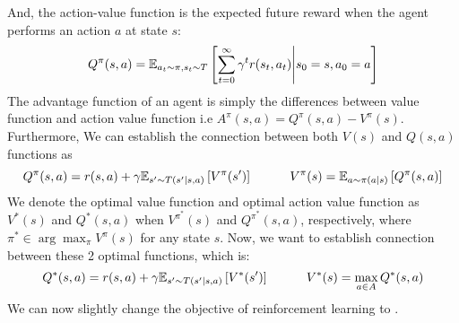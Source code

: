 And, the action-value function is the expected future reward when the agent performs an action $a$ at state $s$: 
\begin{equation}
    Q^\pi(s, a) = \mathbb{E}_{a_t \sim \pi, s_t \sim T}\left[ \sum^\infty_{t=0} \gamma^t r(s_t, a_t) \Bigg| s_0 = s, a_0 = a \right]
\end{equation}
The advantage function of an agent is simply the differences between value function and action value function i.e $A^{\pi}(s, a) = Q^\pi(s, a) - V^\pi(s)$. Furthermore, We can establish the connection between both $V(s)$ and $Q(s, a)$ functions as
\begin{equation}
    \label{eqn:chap2-Q-and-V}
    Q^\pi(s, a) = r(s, a) + \gamma \mathbb{E}_{s' \sim T(s' | s, a)}\left[ V^\pi(s') \right] \quad \quad \quad V^\pi(s) = \mathbb{E}_{a \sim \pi(a | s)} \left[ Q^\pi(s, a) \right]
\end{equation}
We denote the optimal value function and optimal action value function as $V^*(s)$ and $Q^*(s, a)$ when $V^{\pi^*}(s)$ and $Q^{\pi^*}(s, a)$, respectively, where $\pi^* \in \arg\max_{\pi} V^{\pi}(s)$ for any state $s$. Now, we want to establish connection between these 2 optimal functions, which is:
\begin{equation}
\label{eqn:chap2-optim-Q-and-V}
    Q^*(s, a) = r(s, a) + \gamma \mathbb{E}_{s' \sim T(s' | s, a)}\left[ V^*(s') \right] \quad \quad \quad V^*(s) =\max_{a\in A} Q^*(s, a)
\end{equation}
We can now slightly change the objective of reinforcement learning to .

